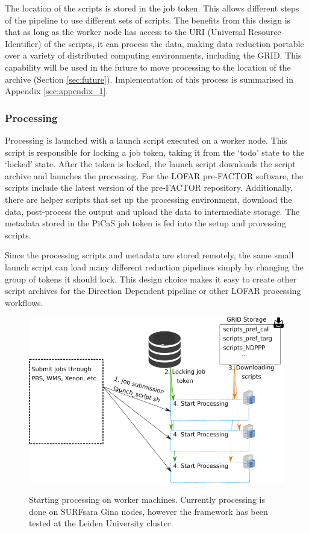 The location of the scripts is stored in the job token. This allows different steps of the pipeline to use different sets of scripts. The benefits from this design is that as long as the worker node has access to the URI (Universal Resource Identifier) of the scripts, it can process the data, making data reduction portable over a variety of distributed computing environments, including the GRID. This capability will be used in the future to move processing to the location of the archive (Section \ref{sec:future}). Implementation of this process is summarised in Appendix \ref{sec:appendix_1}. 


\subsubsection{Processing}

Processing is launched with a launch script executed on a worker node. This script is responsible for locking a job token, taking it from the `todo' state to the `locked' state. After the token is locked, the launch script downloads the script archive and launches the processing. For the LOFAR pre-FACTOR software, the scripts include the latest version of the pre-FACTOR repository. Additionally, there are helper scripts that set up the processing environment, download the data, post-process the output and upload the data to intermediate storage. The metadata stored in the PiCaS job token is fed into the setup and processing scripts. 

Since the processing scripts and metadata are stored remotely, the same small launch script can load many different reduction pipelines simply by changing the group of tokens it should lock.  This design choice makes it easy to create other script archives for the Direction Dependent pipeline or other LOFAR processing workflows. 

\begin{figure}
 \includegraphics[width=.76\textwidth]{ch3/figures/Token_run.png}\\
 \caption{Starting processing on worker machines. Currently processing is done on SURFsara Gina nodes, however the framework has been tested at the Leiden University cluster.}
 \label{fig:tok_run}
\end{figure}


